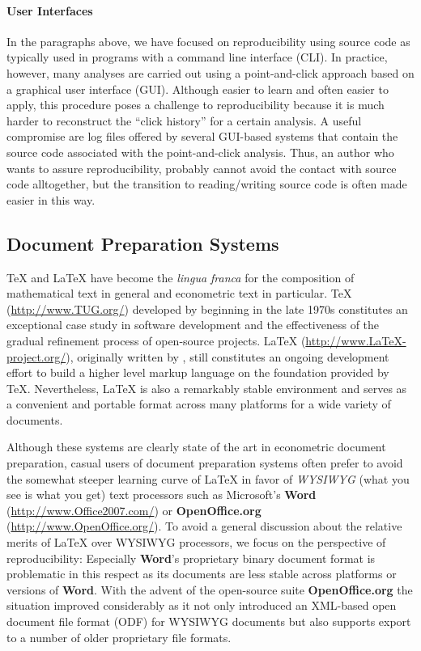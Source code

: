\documentclass[10pt,a4paper,twoside]{article}
\let\pkg=\textbf
\let\proglang=\textsf
\begin{document}
\paragraph{User Interfaces}
In the paragraphs above, we have focused on reproducibility using source code
as typically used in programs with a command line interface (CLI). In practice,
however, many analyses are carried out using a point-and-click approach
based on a graphical user interface (GUI). Although easier to learn and often
easier to apply, this procedure poses a challenge to reproducibility because
it is much harder to reconstruct the ``click history'' for a certain analysis.
A useful compromise are log files offered by several GUI-based systems that
contain the source code associated with the point-and-click analysis. Thus,
an author who wants to assure reproducibility, probably cannot avoid the contact
with source code alltogether, but the transition to reading/writing source
code is often made easier in this way.

\subsection{Document Preparation Systems} \label{sec:document}

{\TeX} and {\LaTeX} have become the \emph{lingua franca} for the composition 
of mathematical text in general and econometric text in particular.
{\TeX} (\url{http://www.TUG.org/}) developed by \cite{repro:Knuth:1984}
beginning in the late 1970s constitutes an exceptional case study in 
software development and the effectiveness of the gradual refinement process 
of open-source projects.  
{\LaTeX} (\url{http://www.LaTeX-project.org/}), originally written by  \cite{repro:Lamport:1994},
still constitutes an ongoing development effort to build a higher level markup
language on the foundation provided by {\TeX}.  Nevertheless, {\LaTeX} is also
a remarkably stable environment and serves as a convenient and portable format
across many platforms for a wide variety of documents. 

Although these systems are clearly state of the art in econometric document
preparation, casual users of document preparation systems often prefer to avoid
the somewhat steeper learning curve of {\LaTeX} in favor of \emph{WYSIWYG}
(what you see is what you get) text processors such as Microsoft's \pkg{Word}
(\url{http://www.Office2007.com/}) or \pkg{OpenOffice.org} (\url{http://www.OpenOffice.org/}).
To avoid a general
discussion about the relative merits of {\LaTeX} over WYSIWYG processors, we focus
on the perspective of reproducibility: Especially \pkg{Word}'s proprietary binary document
format is problematic in this respect as its documents are less stable across platforms or
versions of \pkg{Word}. With the advent of the open-source suite \pkg{OpenOffice.org}
the situation improved considerably as it not only introduced an \proglang{XML}-based
open document file format (ODF) for WYSIWYG documents but also supports export to 
a number of older proprietary file formats.
\end{document}
